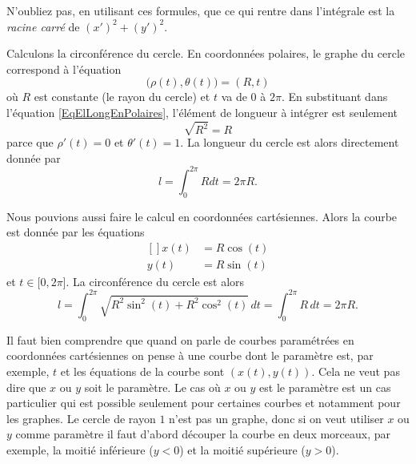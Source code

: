 \begin{remark}
	N'oubliez pas, en utilisant ces formules, que ce qui rentre dans l'intégrale est la \emph{racine carré} de \( (x')^2+(y')^2\).
\end{remark}

\begin{example}     \label{ExempleLongCercle}
	Calculons la circonférence du cercle. En coordonnées polaires, le graphe du cercle correspond à l'équation
	\begin{equation}
		\big( \rho(t),\theta(t) \big)=(R,t)
	\end{equation}
	où \( R\) est constante (le rayon du cercle) et \( t\) va de \( 0\) à \( 2\pi\). En substituant dans l'équation \eqref{EqElLongEnPolaires}, l'élément de longueur à intégrer est seulement
	\begin{equation}
		\sqrt{R^2}=R
	\end{equation}
	parce que \( \rho'(t)=0\) et \( \theta'(t)=1\). La longueur du cercle est alors directement donnée par
	\begin{equation}
		l=\int_0^{2\pi}Rdt=2\pi R.
	\end{equation}

	Nous pouvions aussi faire le calcul en coordonnées cartésiennes. Alors la courbe est donnée par les équations
	\begin{equation}
		\begin{aligned}[]
			x(t) & =R\cos(t) \\
			y(t) & =R\sin(t)
		\end{aligned}
	\end{equation}
	et \( t\in\mathopen[ 0 , 2\pi \mathclose]\). La circonférence du cercle est alors
	\begin{equation}
		l=\int_0^{2\pi}\sqrt{R^2\sin^2(t)+R^2\cos^2(t)}\,dt=\int_0^{2\pi}R\,dt=2\pi R.
	\end{equation}
\end{example}
\begin{remark}
	Il faut bien comprendre que quand on parle de courbes paramétrées en coordonnées cartésiennes on pense à une courbe dont le paramètre est, par exemple, \( t\) et les équations de la courbe sont \( (x(t), y(t))\). Cela ne veut pas dire que \( x\) ou \( y\) soit le paramètre. Le cas où \( x\) ou \( y\) est le paramètre est un cas particulier qui est possible seulement pour certaines courbes et notamment pour les graphes. Le cercle de rayon \( 1\) n'est pas un graphe, donc si on veut utiliser \( x\) ou \( y\) comme paramètre il faut d'abord découper la courbe en deux morceaux, par exemple, la moitié inférieure (\( y<0\)) et la moitié supérieure (\( y>0\)).
\end{remark}
